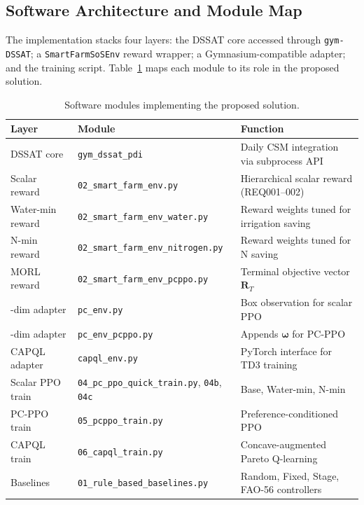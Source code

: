\subsection{Software Architecture and Module Map}

The implementation stacks four layers: the DSSAT core accessed through
\texttt{gym-DSSAT}; a \texttt{SmartFarmSoSEnv} reward wrapper; a
Gymnasium-compatible adapter; and the training script. Table~\ref{tab:software}
maps each module to its role in the proposed solution.

\begin{table}[ht]
\centering
\caption{Software modules implementing the proposed solution.}
\label{tab:software}
\small
\renewcommand{\arraystretch}{1.25}
\begin{tabular}{>{\raggedright\arraybackslash}p{3.6cm}
                >{\raggedright\arraybackslash}p{4.2cm}
                >{\raggedright\arraybackslash}p{5.5cm}}
\toprule
\textbf{Layer} & \textbf{Module} & \textbf{Function} \\
\midrule
DSSAT core      & \texttt{gym\_dssat\_pdi}           & Daily CSM integration via subprocess API \\
Scalar reward   & \texttt{02\_smart\_farm\_env.py}   & Hierarchical scalar reward (REQ001--002) \\
Water-min reward& \texttt{02\_smart\_farm\_env\_water.py} & Reward weights tuned for irrigation saving \\
N-min reward    & \texttt{02\_smart\_farm\_env\_nitrogen.py} & Reward weights tuned for N saving \\
MORL reward     & \texttt{02\_smart\_farm\_env\_pcppo.py} & Terminal objective vector $\mathbf{R}_T$ \\
11-dim adapter  & \texttt{pc\_env.py}                & Box observation for scalar PPO \\
14-dim adapter  & \texttt{pc\_env\_pcppo.py}         & Appends $\boldsymbol{\omega}$ for PC-PPO \\
CAPQL adapter   & \texttt{capql\_env.py}             & PyTorch interface for TD3 training \\
Scalar PPO train& \texttt{04\_pc\_ppo\_quick\_train.py}, \texttt{04b}, \texttt{04c} & Base, Water-min, N-min \\
PC-PPO train    & \texttt{05\_pcppo\_train.py}       & Preference-conditioned PPO \\
CAPQL train     & \texttt{06\_capql\_train.py}       & Concave-augmented Pareto Q-learning \\
Baselines       & \texttt{01\_rule\_based\_baselines.py} & Random, Fixed, Stage, FAO-56 controllers \\
\bottomrule
\end{tabular}
\end{table}


